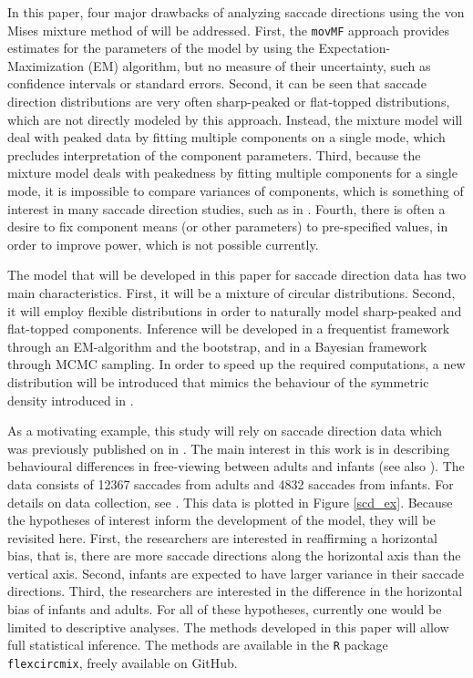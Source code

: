 In this paper, four major drawbacks of analyzing saccade directions using the von Mises mixture method of \citet{hornik2014movmf} will be addressed. First, the \texttt{movMF} approach provides estimates for the parameters of the model by using the Expectation-Maximization (EM) algorithm, but no measure of their uncertainty, such as confidence intervals or standard errors. Second, it can be seen that saccade direction distributions are very often sharp-peaked or flat-topped distributions, which are not directly modeled by this approach. Instead, the mixture model will deal with peaked data by fitting multiple components on a single mode, which precludes interpretation of the component parameters. Third, because the mixture model deals with peakedness by fitting multiple components for a single mode, it is impossible to compare variances of components, which is something of interest in many saccade direction studies, such as in \citet{van2016infants}. Fourth, there is often a desire to fix component means (or other parameters) to pre-specified values, in order to improve power, which is not possible currently.

The model that will be developed in this paper for saccade direction data has two main characteristics. First, it will be a mixture of circular distributions. Second, it will employ flexible distributions in order to naturally model sharp-peaked and flat-topped components. Inference will be developed in a frequentist framework through an EM-algorithm and the bootstrap, and in a Bayesian framework through MCMC sampling. In order to speed up the required computations, a new distribution will be introduced that mimics the behaviour of the symmetric density introduced in \citet{jones2012inverse}.

As a motivating example, this study will rely on saccade direction data which was previously published on in \citet{van2016infants}. The main interest in this work is in describing behavioural differences in free-viewing between adults and infants (see also \citet{aslin2007s}). The data consists of 12367  saccades from adults and 4832 saccades from infants. For details on data collection, see \citet{van2016infants}. This data is plotted in Figure \ref{scd_ex}. Because the hypotheses of interest inform the development of the model, they will be revisited here. First, the researchers are interested in reaffirming a horizontal bias, that is, there are more saccade directions along the horizontal axis than the vertical axis. Second, infants are expected to have larger variance in their saccade directions. Third, the researchers are interested in the difference in the horizontal bias of infants and adults. For all of these hypotheses, currently one would be limited to descriptive analyses. The methods developed in this paper will allow full statistical inference. The methods are available in the \texttt{R} package \texttt{flexcircmix}, freely available on GitHub.

